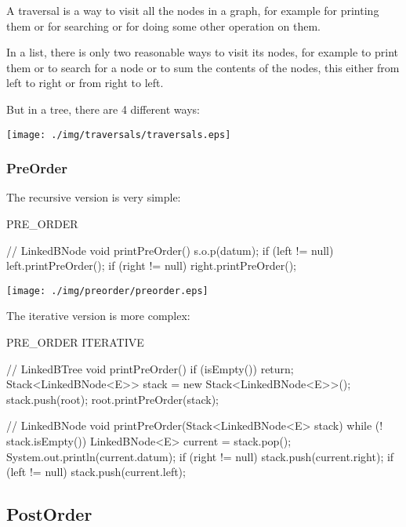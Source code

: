 \documentclass[a4paper, 9pt]{extarticle}
\begin{document}
A traversal is a way to visit all the nodes in a graph, for example for
printing them or for searching or for doing some other operation on them.

In a list, there is only two reasonable ways to visit its nodes,
for example to print them
or to search for a node
or to sum the contents of the nodes,
this either from left to right or from right to left.

But in a tree, there are 4 different ways:



\begin{center}
  \texttt{[image: ./img/traversals/traversals.eps]}
\end{center}


\subsubsection{PreOrder}

The recursive version is very simple:

\begin{multicols}{2}
\begin{blackboard}
      PRE_ORDER

// LinkedBNode
void printPreOrder() {
  s.o.p(datum);
  if (left != null) {
    left.printPreOrder();
  }
  if (right != null) {
    right.printPreOrder();
  }
}
\end{blackboard}
\columnbreak
\texttt{[image: ./img/preorder/preorder.eps]}
\end{multicols}

The iterative version is more complex:

\begin{blackboard}
      PRE_ORDER ITERATIVE

// LinkedBTree
void printPreOrder() {
  if (isEmpty()) {
    return;
  }
  Stack<LinkedBNode<E>> stack =
                   new Stack<LinkedBNode<E>>();
  stack.push(root);
  root.printPreOrder(stack);
}

// LinkedBNode
void printPreOrder(Stack<LinkedBNode<E> stack) {
  while (! stack.isEmpty()) {
    LinkedBNode<E> current = stack.pop();
    System.out.println(current.datum);
    if (right != null) {
      stack.push(current.right);
    }
    if (left != null) {
      stack.push(current.left);
    }
  }
}
\end{blackboard}

\subsection{PostOrder}
\end{document}
